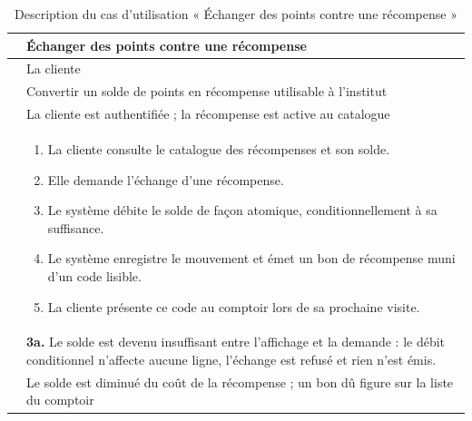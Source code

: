\begin{table}[H]
\centering
\caption{Description du cas d'utilisation « Échanger des points contre une récompense »}
\label{tab:cu-echanger}
\begin{tabularx}{\textwidth}{L{3.1cm} X}
\toprule
{} & Échanger des points contre une récompense \\
\midrule
{} & La cliente \\
 & Convertir un solde de points en récompense utilisable à
l'institut \\
 & La cliente est authentifiée ; la récompense est active
au catalogue \\
 &
\begin{enumerate}[leftmargin=*,nosep]
  \item La cliente consulte le catalogue des récompenses et son solde.
  \item Elle demande l'échange d'une récompense.
  \item Le système débite le solde de façon atomique, conditionnellement à sa
  suffisance.
  \item Le système enregistre le mouvement et émet un bon de récompense muni
  d'un code lisible.
  \item La cliente présente ce code au comptoir lors de sa prochaine visite.
\end{enumerate} \\
 &
\textbf{3a.} Le solde est devenu insuffisant entre l'affichage et la demande :
le débit conditionnel n'affecte aucune ligne, l'échange est refusé et rien
n'est émis. \\
 & Le solde est diminué du coût de la récompense ; un
bon dû figure sur la liste du comptoir \\
\bottomrule
\end{tabularx}
\end{table}

